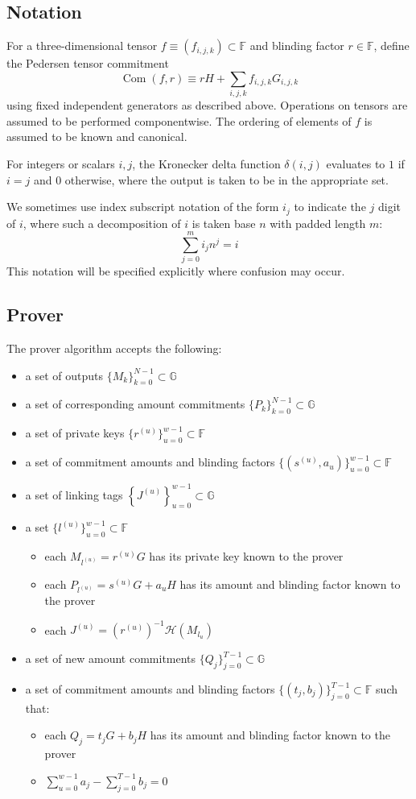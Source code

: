 \documentclass[draft]{article}
\newcommand{\G}{\mathbb{G}}
\newcommand{\F}{\mathbb{F}}
\newcommand{\hp}{\mathcal{H}}
\newcommand{\com}{\operatorname{Com}}
\begin{document}
\subsection{Notation}
For a three-dimensional tensor $f \equiv (f_{i,j,k}) \subset \F$ and blinding factor $r \in \F$, define the Pedersen tensor commitment
$$\com(f,r) \equiv rH + \sum_{i,j,k} f_{i,j,k} G_{i,j,k}$$
using fixed independent generators as described above.
Operations on tensors are assumed to be performed componentwise.
The ordering of elements of $f$ is assumed to be known and canonical.

For integers or scalars $i,j$, the Kronecker delta function $\delta(i,j)$ evaluates to $1$ if $i=j$ and $0$ otherwise, where the output is taken to be in the appropriate set.

We sometimes use index subscript notation of the form $i_j$ to indicate the $j$ digit of $i$, where such a decomposition of $i$ is taken base $n$ with padded length $m$:
$$\sum_{j=0}^m i_j n^j = i$$
This notation will be specified explicitly where confusion may occur.


\subsection{Prover}
The prover algorithm accepts the following:
\begin{itemize}
\item a set of outputs $\{M_k\}_{k=0}^{N-1} \subset \G$
\item a set of corresponding amount commitments $\{P_k\}_{k=0}^{N-1} \subset \G$
\item a set of private keys $\{r^{(u)}\}_{u=0}^{w-1} \subset \F$
\item a set of commitment amounts and blinding factors $\{(s^{(u)},a_u)\}_{u=0}^{w-1} \subset \F$
\item a set of linking tags $\left\{J^{(u)}\right\}_{u=0}^{w-1} \subset \G$
\item a set $\{l^{(u)}\}_{u=0}^{w-1} \subset \F$
\begin{itemize}
\item each $M_{l^{(u)}} = r^{(u)}G$ has its private key known to the prover
\item each $P_{l^{(u)}} = s^{(u)}G + a_uH$ has its amount and blinding factor known to the prover
\item each $J^{(u)} = (r^{(u)})^{-1}\hp(M_{l_u})$
\end{itemize}
\item a set of new amount commitments $\{Q_j\}_{j=0}^{T-1} \subset \G$
\item a set of commitment amounts and blinding factors $\{(t_j,b_j)\}_{j=0}^{T-1} \subset \F$ such that:
\begin{itemize}
\item each $Q_j = t_jG + b_jH$ has its amount and blinding factor known to the prover
\item $\sum_{u=0}^{w-1} a_j - \sum_{j=0}^{T-1} b_j = 0$
\end{itemize}
\end{itemize}
\end{document}
